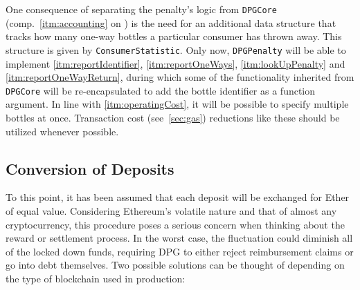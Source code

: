 \begin{description}[format={\storedescriptionlabel}]
	One consequence of separating the penalty's logic from \texttt{DPGCore} (comp.~\ref{itm:accounting} on ) is the need for an additional data structure that tracks how many one-way bottles a particular consumer has thrown away. This structure is given by \texttt{ConsumerStatistic}. Only now, \texttt{DPGPenalty} will be able to implement \ref{itm:reportIdentifier}, \ref{itm:reportOneWays}, \ref{itm:lookUpPenalty} and \ref{itm:reportOneWayReturn}, during which some of the functionality inherited from \texttt{DPGCore} will be re-encapsulated to add the bottle identifier as a function argument. In line with \ref{itm:operatingCost}, it will be possible to specify multiple bottles at once. Transaction cost (see~\ref{sec:gas}) reductions like these should be utilized whenever possible.
\end{description}



\subsection{Conversion of Deposits}
To this point, it has been assumed that each deposit will be exchanged for Ether of equal value. Considering Ethereum's volatile nature and that of almost any cryptocurrency, this procedure poses a serious concern when thinking about the reward or settlement process. In the worst case, the fluctuation could diminish all of the locked down funds, requiring \ac{DPG} to either reject reimbursement claims or go into debt themselves. Two possible solutions can be thought of depending on the type of blockchain used in production:

